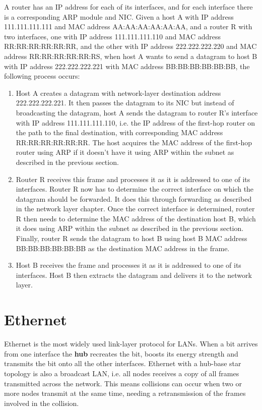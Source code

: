 \documentclass[12pt letter]{report}
\begin{document}
A router has an IP address for each of its interfaces, and for each
interface there is a corresponding ARP module and NIC. Given a host A
with IP address 111.111.111.111 and MAC address AA:AA:AA:AA:AA:AA,
and a router R with two interfaces, one with IP address
111.111.111.110 and MAC address RR:RR:RR:RR:RR:RR, and the other with
IP address 222.222.222.220 and MAC address RR:RR:RR:RR:RR:RS, when
host A wants to send a datagram to host B with IP address
222.222.222.221 with MAC address BB:BB:BB:BB:BB:BB, the following
process occurs:
\begin{enumerate}
  \item Host A creates a datagram with network-layer destination
    address 222.222.222.221. It then passes the datagram to its NIC
    but instead of broadcasting the datagram, host A sends the
    datagram to router R's interface with IP address 111.111.111.110,
    i.e. the IP address of the first-hop router on the path to the final
    destination, with corresponding MAC address RR:RR:RR:RR:RR:RR.
    The host acquires the MAC address of the first-hop router using
    ARP if it doesn't have it using ARP within the subnet as
    described in the previous section.
  \item Router R receives this frame and processes it as it is
    addressed to one of its interfaces. Router R now has to determine
    the correct interface on which the datagram should be forwarded.
    It does this through forwarding as described in the network layer
    chapter. Once the correct interface is determined, router R then
    needs to determine the MAC address of the destination host B,
    which it does using ARP within the subnet as described in the
    previous section. Finally, router R sends the datagram to host B
    using host B MAC address BB:BB:BB:BB:BB:BB as the destination MAC
    address in the
    frame.
  \item Host B receives the frame and processes it as it is addressed
    to one of its interfaces. Host B then extracts the datagram and
    delivers it to the network layer.
\end{enumerate}

\section{Ethernet}


Ethernet is the most widely used link-layer protocol for LANs. When a
bit arrives from one interface the \textbf{hub}  recreates the bit,
boosts its energy strength and transmits the bit onto all the other
interfaces. Ethernet with a hub-base star topology is also a
broadcast LAN, i.e. all nodes receives a copy of all frames
transmitted across the network. This means collisions can occur when
two or more nodes transmit at the same time, needing a retransmission
of the frames involved in the collision.
\end{document}
